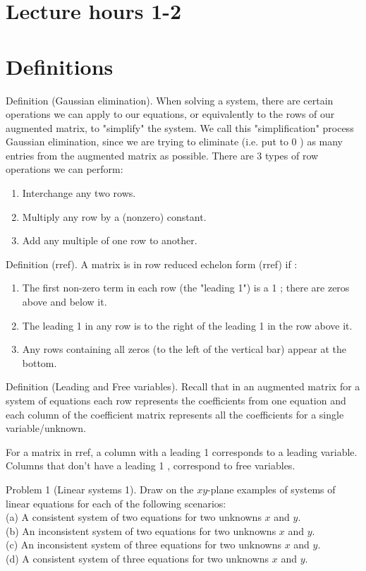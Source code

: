 \documentclass[10pt]{article}
\begin{document}
\section*{Lecture hours 1-2}
\section*{Definitions}
Definition (Gaussian elimination). When solving a system, there are certain operations we can apply to our equations, or equivalently to the rows of our augmented matrix, to "simplify" the system. We call this "simplification" process Gaussian elimination, since we are trying to eliminate (i.e. put to 0 ) as many entries from the augmented matrix as possible. There are 3 types of row operations we can perform:

\begin{enumerate}
  \item Interchange any two rows.
  \item Multiply any row by a (nonzero) constant.
  \item Add any multiple of one row to another.
\end{enumerate}

Definition (rref). A matrix is in row reduced echelon form (rref) if :

\begin{enumerate}
  \item The first non-zero term in each row (the "leading 1") is a 1 ; there are zeros above and below it.
  \item The leading 1 in any row is to the right of the leading 1 in the row above it.
  \item Any rows containing all zeros (to the left of the vertical bar) appear at the bottom.
\end{enumerate}

Definition (Leading and Free variables). Recall that in an augmented matrix for a system of equations each row represents the coefficients from one equation and each column of the coefficient matrix represents all the coefficients for a single variable/unknown.

For a matrix in rref, a column with a leading 1 corresponds to a leading variable. Columns that don't have a leading 1 , correspond to free variables.

Problem 1 (Linear systems 1). Draw on the $x y$-plane examples of systems of linear equations for each of the following scenarios:\\
(a) A consistent system of two equations for two unknowns $x$ and $y$.\\
(b) An inconsistent system of two equations for two unknowns $x$ and $y$.\\
(c) An inconsistent system of three equations for two unknowns $x$ and $y$.\\
(d) A consistent system of three equations for two unknowns $x$ and $y$.
\end{document}
